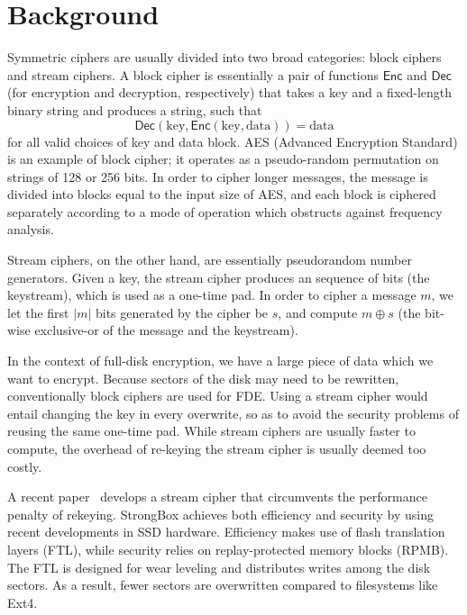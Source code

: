 \documentclass[11pt,twocolumn]{article}
\newcommand\Enc{\mathsf{Enc}}
\newcommand\Dec{\mathsf{Dec}}
\begin{document}
	\section*{Background}
	
	Symmetric ciphers are usually divided into two broad categories: block ciphers and stream ciphers.
	A block cipher is essentially a pair of functions $\Enc$ and $\Dec$
	(for encryption and decryption, respectively)
	that takes a key and a fixed-length binary string
	and produces a string,
	such that
	\begin{equation*}
	\Dec(\mathrm{key}, \Enc(\mathrm{key}, \mathrm{data})) = \mathrm{data}
	\end{equation*}
	for all valid choices of key and data block.
	AES (Advanced Encryption Standard) is an example of block cipher;
	it operates as a pseudo-random permutation on strings of 128 or 256 bits.
	In order to cipher longer messages,
	the message is divided into blocks equal to the input size of AES, and each block is ciphered separately according to a mode of operation which obstructs against frequency analysis.
	
	Stream ciphers, on the other hand,
	are essentially pseudorandom number generators.
	Given a key,
	the stream cipher produces an sequence of bits
	(the keystream), which is used as a one-time pad.
	In order to cipher a message $m$,
	we let the first $|m|$ bits generated by the cipher be $s$,
	and compute $m \oplus s$
	(the bit-wise exclusive-or of the message and the keystream).
	
	In the context of full-disk encryption,
	we have a large piece of data which we want to encrypt.
	Because sectors of the disk may need to be rewritten,
	conventionally block ciphers are used for FDE.
	Using a stream cipher would entail changing the key in every overwrite,
	so as to avoid the security problems of reusing the same one-time pad.
	While stream ciphers are usually faster to compute,
	the overhead of re-keying the stream cipher is usually deemed too costly.
	
	A recent paper~\cite{StrongBox2018} develops a stream cipher
	that circumvents the performance penalty of rekeying.
	StrongBox achieves both efficiency and security by using recent developments in SSD hardware.
	Efficiency makes use of flash translation layers (FTL),
	while security relies on replay-protected memory blocks (RPMB).
	The FTL is designed for wear leveling and distributes writes among the disk sectors.
	As a result, fewer sectors are overwritten compared to filesystems like Ext4.
	
\end{document}
